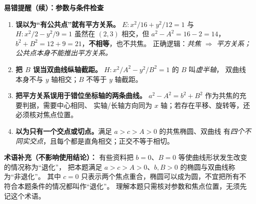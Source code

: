 \begin{trapbox}
\textbf{易错提醒（续）：参数与条件检查}
\begin{enumerate}[start=8]
\item \textbf{误以为“有公共点”就有平方关系。}
$E:x^2/16+y^2/12=1$ 与 $H:x^2/2-y^2/9=1$
虽然在 $(2,3)$ 相交，但 $a^2-A^2=16-2=14$，
$b^2+B^2=12+9=21$，\textbf{不相等}，也不共焦。
正确逻辑：\emph{共焦 $\Rightarrow$ 平方关系；公共点本身不能推出平方关系。}

\item \textbf{把 $B$ 误当双曲线纵轴截距。}
$H:x^2/A^2-y^2/B^2=1$ 的 $B$ 叫\emph{虚半轴}，
双曲线本身不与 $y$ 轴相交；$B$ 不等于 $y$ 轴截距。

\item \textbf{把平方关系误用于错位坐标轴的两条曲线。}
$a^2-A^2=b^2+B^2$ 作为共焦的充要判据，需要中心相同、
实轴/长轴方向同为 $x$ 轴；若存在平移、旋转等，还必须核对焦点位置。

\item \textbf{以为只有一个交点或切点。}满足 $a>c>A>0$ 的共焦椭圆、双曲线
有\emph{四个不同实交点}，且每个都是直角相交；正交不等于相切。
\end{enumerate}

\medskip
\textbf{术语补充（不影响使用结论）：}
有些资料把 $b=0$、$B=0$ 等使曲线形状发生改变的情况称为“退化”，
把本题满足 $a>c>A>0$、$b,B>0$ 的椭圆与双曲线称为“非退化”。
其中 $c=0$ 只表示两个焦点重合，椭圆可以成为圆，不宜把所有不符合本题条件的情况都叫作“退化”。
理解本题只需核对参数和焦点位置，无须先记这个术语。

\end{trapbox}
